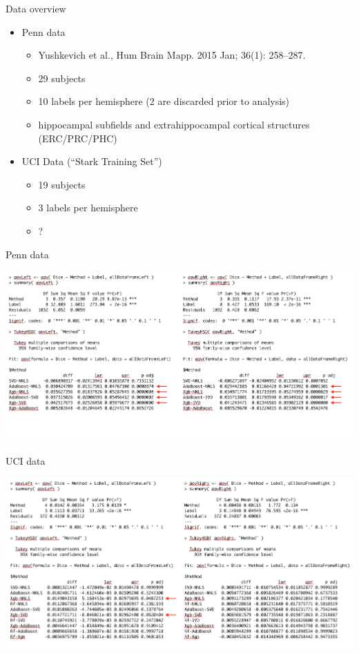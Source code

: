 \documentclass[ignorenonframetext,]{beamer}
\providecommand{\tightlist}{%
\setlength{\itemsep}{0pt}\setlength{\parskip}{0pt}}
\begin{document}
\begin{frame}{Data overview}

\begin{itemize}
\tightlist
\item
  Penn data

  \begin{itemize}
  \tightlist
  \item
    Yushkevich et al., Hum Brain Mapp. 2015 Jan; 36(1): 258--287.
  \item
    29 subjects
  \item
    10 labels per hemisphere (2 are discarded prior to analysis)
  \item
    hippocampal subfields and extrahippocampal cortical structures
    (ERC/PRC/PHC)
  \end{itemize}
\item
  UCI Data (``Stark Training Set'')

  \begin{itemize}
  \tightlist
  \item
    19 subjects
  \item
    3 labels per hemisphere
  \item
    ?
  \end{itemize}
\end{itemize}

\end{frame}

\begin{frame}{Penn data}

\centering
\includegraphics[width=1 \textwidth]{../Figures/pennResults.png}

\end{frame}

\begin{frame}{UCI data}

\centering
\includegraphics[width=1 \textwidth]{../Figures/uciResults.png}

\end{frame}
\end{document}
